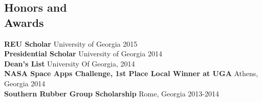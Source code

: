 \documentclass[margin,line]{resume}
\begin{document}
\begin{resume}
	\section{\mysidestyle Honors and\\Awards} 
	\textbf{REU Scholar} \hfill University of Georgia 2015\\
	\textbf{Presidential Scholar} \hfill University of Georgia 2014\\
	\textbf{Dean's List} \hfill University Of Georgia, 2014\\
	\textbf{NASA Space Apps Challenge, 1st Place Local Winner at UGA} \hfill Athens, Georgia 2014\\%
	\textbf{Southern Rubber Group Scholarship} \hfill Rome, Georgia 2013-2014
	     
	
	
	
	
	
	
	
	
	
	\end{resume}
	
\end{document}
